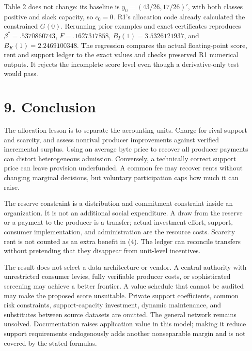 \documentclass[
  11pt,
]{article}
\begin{document}
Table 2 does not change: its baseline is \(y_0=(43/26,17/26)'\), with
both classes positive and slack capacity, so \(c_0=0\). R1's allocation
code already calculated the constrained \(G(0)\). Rerunning prior
examples and exact certificates reproduces \(\beta^*=.5370860743\),
\(F=.1627317858\), \(B_I(1)=3.5326121937\), and \(B_K(1)=2.2469100348\).
The regression compares the actual floating-point score, rent and
support ledger to the exact values and checks preserved R1 numerical
outputs. It rejects the incomplete score level even though a
derivative-only test would pass.

\section{9. Conclusion}\label{interpretation-and-limitations}

The allocation lesson is to separate the accounting units. Charge for
rival support and scarcity, and assess nonrival producer improvements
against verified incremental surplus. Using an average byte price to
recover all producer payments can distort heterogeneous admission.
Conversely, a technically correct support price can leave provision
underfunded. A common fee may recover rents without changing marginal
decisions, but voluntary participation caps how much it can raise.

The reserve constraint is a distribution and commitment constraint
inside an organization. It is not an additional social expenditure. A
draw from the reserve or a payment to the producer is a transfer; actual
investment effort, support, consumer implementation, and administration
are the resource costs. Scarcity rent is not counted as an extra benefit
in (4). The ledger can reconcile transfers without pretending that they
disappear from unit-level incentives.

The result does not select a data architecture or vendor. A central
authority with unrestricted consumer levies, fully verifiable producer
costs, or sophisticated screening may achieve a better frontier. A value
schedule that cannot be audited may make the proposed score unsuitable.
Private support coefficients, common risk constraints, support-capacity
investment, dynamic maintenance, and substitutes between source datasets
are omitted. The general network remains unsolved. Documentation raises
application value in this model; making it reduce support requirements
endogenously adds another nonseparable margin and is not covered by the
stated formulas.
\end{document}

